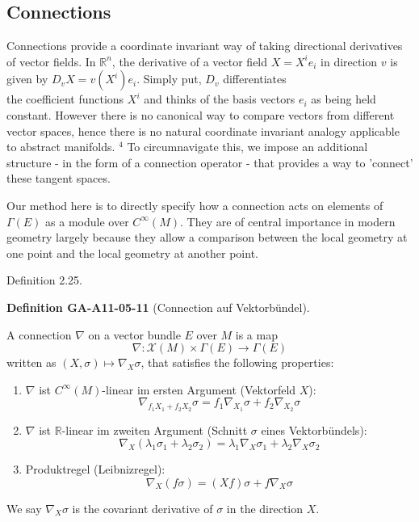 \documentclass[10pt, letterpaper]{article}
\newcommand{\CustomHeading}[3]{%
  \par\medskip\noindent%
  \textbf{#1 #2} \textnormal{(#3)}.\enskip%
}
\newenvironment{DEF}[2]{\begin{unitbox}\CustomHeading{Definition}{#1}{#2}}{\end{unitbox}}
\begin{document}
\subsection*{Connections}
Connections provide a coordinate invariant way of taking directional derivatives of vector fields. In $\mathbb{R}^{n}$, the derivative of a vector field $X=X^{i} e_{i}$ in direction $v$ is given by $D_{v} X=v\left(X^{i}\right) e_{i}$. Simply put, $D_{v}$ differentiates\\
the coefficient functions $X^{i}$ and thinks of the basis vectors $e_{i}$ as being held constant. However there is no canonical way to compare vectors from different vector spaces, hence there is no natural coordinate invariant analogy applicable to abstract manifolds. ${ }^{4}$ To circumnavigate this, we impose an additional structure - in the form of a connection operator - that provides a way to 'connect' these tangent spaces.

Our method here is to directly specify how a connection acts on elements of $\Gamma(E)$ as a module over $C^{\infty}(M)$. They are of central importance in modern geometry largely because they allow a comparison between the local geometry at one point and the local geometry at another point.

Definition 2.25. 


\begin{DEF}{GA-A11-05-11}{Connection auf Vektorbündel}
A connection $\nabla$ on a vector bundle $E$ over $M$ is a map
$$
\nabla: \mathscr{X}(M) \times \Gamma(E) \rightarrow \Gamma(E)
$$
written as $(X, \sigma) \mapsto \nabla_{X} \sigma$, that satisfies the following properties:

\begin{enumerate}
  \item $\nabla$ ist $C^{\infty}(M)$-linear im ersten Argument (Vektorfeld $X$):
  \[
    \nabla_{f_1 X_1 + f_2 X_2} \sigma = f_1 \nabla_{X_1} \sigma + f_2 \nabla_{X_2} \sigma
  \]
  
  \item $\nabla$ ist $\mathbb{R}$-linear im zweiten Argument (Schnitt $\sigma$ eines Vektorbündels):
  \[
    \nabla_X(\lambda_1 \sigma_1 + \lambda_2 \sigma_2) = \lambda_1 \nabla_X \sigma_1 + \lambda_2 \nabla_X \sigma_2
  \]
  
  \item Produktregel (Leibnizregel):
  \[
    \nabla_X(f \sigma) = (Xf) \sigma + f \nabla_X \sigma
  \]
\end{enumerate}
We say $\nabla_{X} \sigma$ is the covariant derivative of $\sigma$ in the direction $X$.
\end{DEF}
\end{document}
